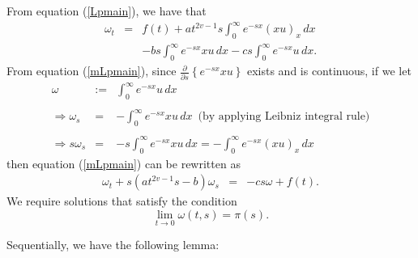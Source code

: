 \documentclass[preprint, 12pt]{elsarticle}
\numberwithin{equation}{section}
\theoremstyle{plain}
\theoremstyle{remark}
\newcommand{\assign}{:=}
\begin{document}
From equation (\ref{Lpmain}), we have that
\begin{eqnarray}
\omega_t & = & f (t) + a t^{2 v - 1} s \int_0^{\infty}{ e^{- s x}  (x u)_x\, d x} \label{mLpmain} \\
& & - b s \int_0^{\infty}{ e^{- s x} x u\, d x} - c s \int_0^{\infty}{ e^{- s x} u\, d x}.\nonumber
\end{eqnarray}
From equation (\ref{mLpmain}), since $\displaystyle{\frac{\partial}{\partial s} \left\{e^{- s x} x u\right\}}$ exists and is continuous, if we let
\begin{eqnarray*}
\omega & \assign & \int_0^{\infty} e^{- s x} u\, d x\\
&  & \\
\Longrightarrow \omega_s & = & - \int_0^{\infty} e^{- s x} x u\, d x \,\,\,\text{(by applying Leibniz integral rule)}\\
&  & \\
\Longrightarrow s \omega_s & = & - s \int_0^{\infty} e^{- s x} x u\, d x = - \int_0^{\infty} e^{- s x}  (x u)_x\, d x
\end{eqnarray*}
then equation (\ref{mLpmain}) can be rewritten as
\begin{eqnarray}
\omega_t + s (a t^{2 v - 1} s - b) \omega_s & = & - c s \omega + f (t) \label{omegat}.
\end{eqnarray}
We require solutions that satisfy the condition
\[ \lim_{t \rightarrow 0} \omega (t, s) = \pi (s) . \]

Sequentially, we have the following lemma:
\end{document}
